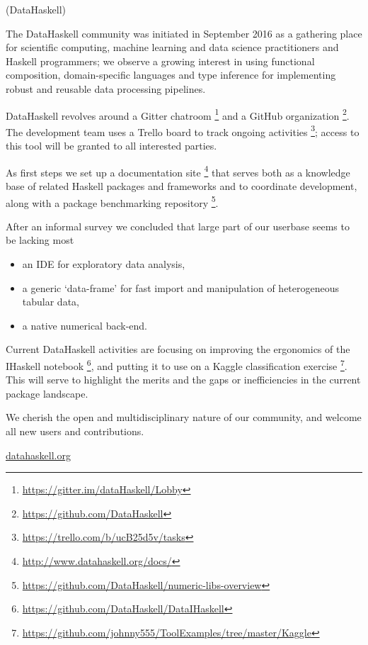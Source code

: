 \documentclass[DIV16,twocolumn,10pt]{scrreprt}
\begin{document}
\begin{hcarentry}{(DataHaskell)}
\makeheader

The DataHaskell community was initiated in September 2016 as a gathering place for scientific computing, machine learning and data science practitioners and Haskell programmers; we observe a growing interest in using functional composition, domain-specific languages and type inference for implementing robust and reusable data processing pipelines.

DataHaskell revolves around a Gitter chatroom \footnote{\url{https://gitter.im/dataHaskell/Lobby}} and a GitHub organization \footnote{\url{https://github.com/DataHaskell}}. The development team uses a Trello board to track ongoing activities \footnote{\url{https://trello.com/b/ucB25d5v/tasks}}; access to this tool will be granted to all interested parties.

As first steps we set up a documentation site \footnote{\url{http://www.datahaskell.org/docs/}} that serves both as a knowledge base of related Haskell packages and frameworks and to coordinate development, along with a package benchmarking repository \footnote{\url{https://github.com/DataHaskell/numeric-libs-overview}}.

After an informal survey we concluded that large part of our userbase seems to be lacking most
\begin{itemize} 
\item an IDE for exploratory data analysis,
\item a generic `data-frame' for fast import and manipulation of heterogeneous tabular data,
\item a native numerical back-end.
\end{itemize}
Current DataHaskell activities are focusing on improving the ergonomics of the IHaskell notebook \footnote{\url{https://github.com/DataHaskell/DataIHaskell}}, and putting it to use on a Kaggle classification exercise \footnote{\url{https://github.com/johnny555/ToolExamples/tree/master/Kaggle}}. This will serve to highlight the merits and the gaps or inefficiencies in the current package landscape.

We cherish the open and multidisciplinary nature of our community, and welcome all new users and contributions.

\FurtherReading
  \url{datahaskell.org}
\end{hcarentry}
\end{document}
